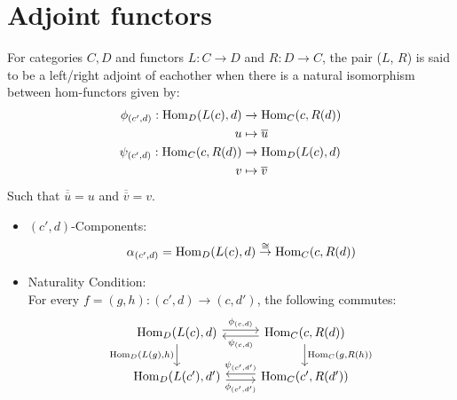 \section{Adjoint functors}

\begin{definition}
  For categories $C, D$ and functors $L: C\to
  D$ and $R: D\to C$, the pair ($L$, $R$) is said to be a left/right adjoint of
  eachother when there is a natural isomorphism between hom-functors given by:
  \parencite{leinster:basic_category_theory}
  \[
    \begin{aligned}
      \phi_{(c', d)}: \mathrm{Hom}_D(L(c), d) &\to \mathrm{Hom}_C(c, R(d))\\
      u &\mapsto \overline{u}\\
      \psi_{(c', d)}: \mathrm{Hom}_C(c, R(d)) &\to \mathrm{Hom}_D(L(c), d)\\
      v &\mapsto \overline{v}
    \end{aligned}
  \]
  Such that $\overline{\overline{u}} = u$ and $\overline{\overline{v}} = v$.

  \begin{itemize}
    \item $(c', d)$-Components:
      \[
        \alpha_{(c', d)}
          = \mathrm{Hom}_D(L(c), d) \overset{\cong}{\to} \mathrm{Hom}_C(c, R(d))\\
      \]
    \item Naturality Condition:\\
      For every $f = (g, h): (c', d) \to (c, d')$, the following commutes:
      \[\begin{tikzcd}[ampersand replacement=\&]
        {\Hom_D(L(c), d)} \& {\Hom_C(c, R(d))} \\
        {\Hom_D(L(c'),d')} \& {\Hom_C(c',R(d'))}
        \arrow["{\Hom_D(L(g), h)}"', from=1-1, to=2-1]
        \arrow["{\Hom_C(g, R(h))}", from=1-2, to=2-2]
        \arrow["{\phi_{(c, d)}}", shift left=1, from=1-1, to=1-2]
        \arrow["{\phi_{(c',d')}}"', shift right=1, from=2-1, to=2-2]
        \arrow["{\psi_{(c',d')}}"', shift right=1, from=2-2, to=2-1]
        \arrow["{\psi_{(c,d)}}", shift left=1, from=1-2, to=1-1]
      \end{tikzcd}\]


\end{itemize}
\end{definition}

